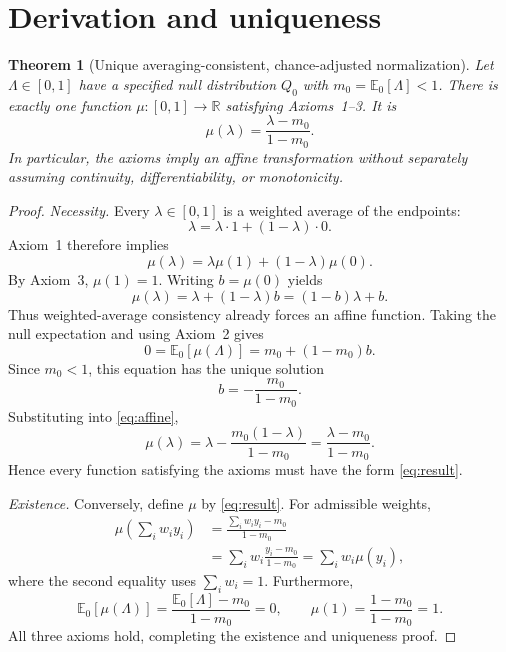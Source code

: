 \documentclass[11pt]{article}
\newcommand{\E}{\mathbb{E}}
\newcommand{\R}{\mathbb{R}}
\newtheorem{theorem}{Theorem}
\begin{document}
\section{Derivation and uniqueness}

\begin{theorem}[Unique averaging-consistent, chance-adjusted normalization]
Let $\Lambda\in[0,1]$ have a specified null distribution $Q_0$ with
$m_0=\E_0[\Lambda]<1$. There is exactly one function
$\mu:[0,1]\to\R$ satisfying Axioms~1--3. It is
\begin{equation}
 \boxed{\displaystyle
 \mu(\lambda)=\frac{\lambda-m_0}{1-m_0}.}
 \label{eq:result}
\end{equation}
In particular, the axioms imply an affine transformation without separately
assuming continuity, differentiability, or monotonicity.
\end{theorem}

\begin{proof}
\textit{Necessity.}
Every $\lambda\in[0,1]$ is a weighted average of the endpoints:
\[
 \lambda=\lambda\cdot1+(1-\lambda)\cdot0.
\]
Axiom~1 therefore implies
\[
 \mu(\lambda)=\lambda\mu(1)+(1-\lambda)\mu(0).
\]
By Axiom~3, $\mu(1)=1$. Writing $b=\mu(0)$ yields
\begin{equation}
 \mu(\lambda)=\lambda+(1-\lambda)b
             =(1-b)\lambda+b.
 \label{eq:affine}
\end{equation}
Thus weighted-average consistency already forces an affine function.
Taking the null expectation and using Axiom~2 gives
\[
 0=\E_0[\mu(\Lambda)]
  =m_0+(1-m_0)b.
\]
Since $m_0<1$, this equation has the unique solution
\[
 b=-\frac{m_0}{1-m_0}.
\]
Substituting into \eqref{eq:affine},
\[
 \mu(\lambda)
 =\lambda-\frac{m_0(1-\lambda)}{1-m_0}
 =\frac{\lambda-m_0}{1-m_0}.
\]
Hence every function satisfying the axioms must have the form
\eqref{eq:result}.

\textit{Existence.}
Conversely, define $\mu$ by \eqref{eq:result}. For admissible weights,
\begin{align*}
 \mu\!\left(\sum_iw_i y_i\right)
 &=\frac{\sum_iw_i y_i-m_0}{1-m_0}\\
 &=\sum_iw_i\frac{y_i-m_0}{1-m_0}
 =\sum_iw_i\mu(y_i),
\end{align*}
where the second equality uses $\sum_iw_i=1$. Furthermore,
\[
 \E_0[\mu(\Lambda)]
 =\frac{\E_0[\Lambda]-m_0}{1-m_0}=0,
 \qquad
 \mu(1)=\frac{1-m_0}{1-m_0}=1.
\]
All three axioms hold, completing the existence and uniqueness proof.
\end{proof}
\end{document}
